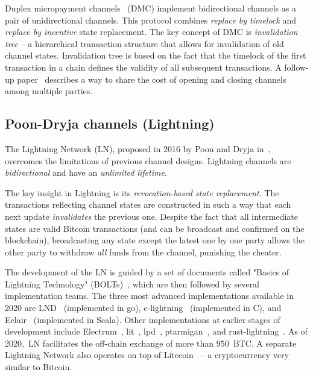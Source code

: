 Duplex micropayment channels~\cite{Decker2015} (DMC) implement bidirectional channels as a pair of unidirectional channels.
This protocol combines \textit{replace by timelock} and \textit{replace by incentive} state replacement.
The key concept of DMC is \textit{invalidation tree} -- a hierarchical transaction structure that allows for invalidation of old channel states.
Invalidation tree is based on the fact that the timelock of the first transaction in a chain defines the validity of all subsequent transactions.
A follow-up paper~\cite{Burchert2017} describes a way to share the cost of opening and closing channels among multiple parties.


\subsection{Poon-Dryja channels (Lightning)}

The Lightning Network (LN), proposed in 2016 by Poon and Dryja in~\cite{Poon2016}, overcomes the limitations of previous channel designs.
Lightning channels are \textit{bidirectional} and have an \textit{unlimited lifetime}.

The key insight in Lightning is its \textit{revocation-based state replacement}.
The transactions reflecting channel states are constructed in such a way that each next update \textit{invalidates} the previous one.
Despite the fact that all intermediate states are valid Bitcoin transactions (and can be broadcast and confirmed on the blockchain), broadcasting any state except the latest one by one party allows the other party to withdraw \textit{all} funds from the channel, punishing the cheater.

The development of the LN is guided by a set of documents called "Basics of Lightning Technology" (BOLTs)~\cite{BOLT}, which are then followed by several implementation teams.
The three most advanced implementations available in 2020 are LND~\cite{LND} (implemented in go), c-lightning~\cite{clightning} (implemented in C), and Eclair~\cite{Eclair} (implemented in Scala).
Other implementations at earlier stages of development include Electrum~\cite{ElectrumWebsite, ElectrumLightningAnnounce}, lit~\cite{lit}, lpd~\cite{lpd}, ptarmigan~\cite{ptarmigan}, and rust-lightning~\cite{rustlightning}.
As of 2020,~LN facilitates the off-chain exchange of more than $950$~BTC\@.
A separate Lightning Network also operates on top of Litecoin~\cite{1MLLitecoin} -- a cryptocurrency very similar to Bitcoin.

